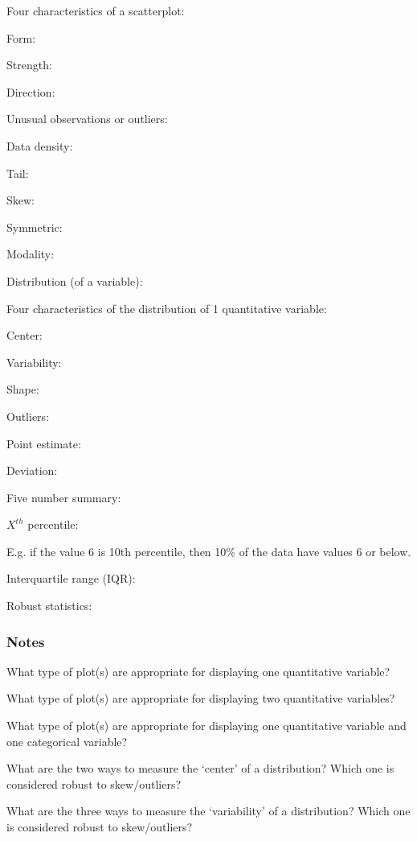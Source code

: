 \documentclass[
]{report}
\newcommand{\rgs}{\vspace{12pt}} %
\newcommand{\rgi}{\hspace{24pt}}  %
\begin{document}
Four characteristics of a scatterplot:

\rgi Form:
\rgs

\rgi Strength:
\rgs

\rgi Direction:
\rgs

\rgi Unusual observations or outliers:
\rgs

Data density:
\rgs

Tail:
\rgs

Skew:
\rgs

Symmetric:
\rgs

Modality:
\rgs

Distribution (of a variable):
\rgs

\rgi Four characteristics of the distribution of 1 quantitative variable:

\rgi Center:
\rgs

\rgi Variability:
\rgs

\rgi Shape:
\rgs

\rgi Outliers:
\rgs

Point estimate:
\rgs

Deviation:
\rgs

Five number summary:
\rgs

\(X^{th}\) percentile:
\rgs

E.g. if the value 6 is 10th percentile, then 10\% of the data have values 6 or below.

Interquartile range (IQR):
\rgs

Robust statistics:
\rgs

\hypertarget{notes-6}{%
\subsubsection*{Notes}\label{notes-6}}

What type of plot(s) are appropriate for displaying one quantitative variable?
\rgs

What type of plot(s) are appropriate for displaying two quantitative variables?
\rgs

What type of plot(s) are appropriate for displaying one quantitative variable and one categorical variable?
\rgs

What are the two ways to measure the `center' of a distribution? Which one is considered robust to skew/outliers?
\rgs

What are the three ways to measure the `variability' of a distribution? Which one is considered robust to skew/outliers?
\rgs
\end{document}
